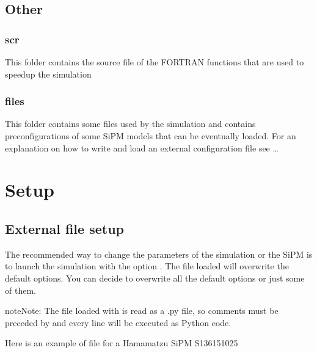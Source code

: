 \documentclass[letterpaper,10pt,english]{sphinxmanual}
\begin{document}
\section{Other}
\label{\detokenize{structure:other}}

\subsection{scr}
\label{\detokenize{structure:scr}}
This folder contains the source file of the FORTRAN functions that are used to speed\sphinxhyphen{}up the simulation


\subsection{files}
\label{\detokenize{structure:files}}
This folder contains some files used by the simulation and contains pre\sphinxhyphen{}configurations of some SiPM models that can be eventually loaded.
For an explanation on how to write and load an external configuration file see …


\chapter{Setup}
\label{\detokenize{setup:setup}}\label{\detokenize{setup::doc}}

\section{External file setup}
\label{\detokenize{setup:external-file-setup}}
The recommended way to change the parameters of the simulation or the SiPM is to launch the simulation with the option . The file loaded will overwrite the default options.
You can decide to overwrite all the default options or just some of them.

\begin{sphinxadmonition}{note}{Note:}
The file loaded with  is read as a .py file, so comments must be preceded by \sphinxtitleref{\#} and every line will be executed as Python code.
\end{sphinxadmonition}

Here is an example of file for a Hamamatzu SiPM S13615\sphinxhyphen{}1025

\begin{sphinxVerbatim}[commandchars=\\\{\}]
  
  
  
  
  
  
  

  
  
  
\end{sphinxVerbatim}
\end{document}
